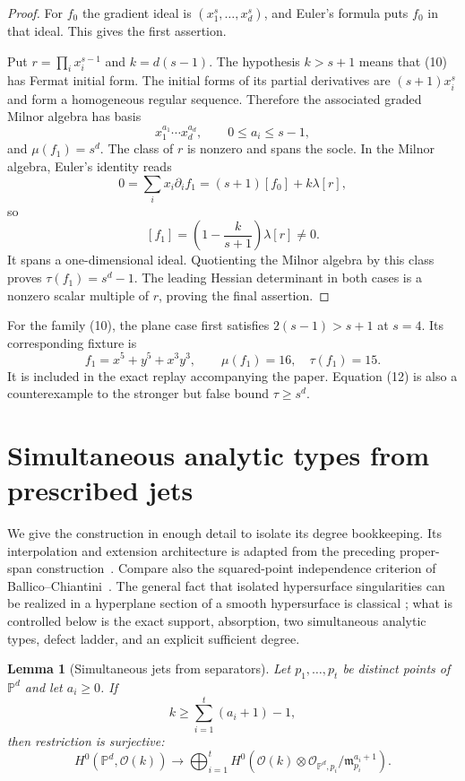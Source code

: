 \documentclass[11pt,a4paper]{article}
\newtheorem{lemma}[theorem]{Lemma}
\theoremstyle{definition}
\newcommand{\PP}{\mathbb P}
\newcommand{\cO}{\mathcal O}
\newcommand{\m}{\mathfrak m}
\begin{document}
\begin{proof}
For $f_0$ the gradient ideal is $(x_1^s,\ldots,x_d^s)$, and Euler's formula
puts $f_0$ in that ideal.  This gives the first assertion.

Put $r=\prod_i x_i^{s-1}$ and $k=d(s-1)$.  The hypothesis $k>s+1$ means
that (10) has Fermat initial form.  The initial forms of its partial
derivatives are $(s+1)x_i^s$ and form a homogeneous regular sequence.
Therefore the associated graded Milnor algebra has basis
\[
 x_1^{a_1}\cdots x_d^{a_d},\qquad 0\le a_i\le s-1,
\]
and $\mu(f_1)=s^d$.  The class of $r$ is nonzero and spans the socle.  In the
Milnor algebra, Euler's identity reads
\[
 0=\sum_i x_i\partial_i f_1=(s+1)[f_0]+k\lambda[r],
\]
so
\[
 [f_1]=\left(1-\frac{k}{s+1}\right)\lambda[r]\ne0.
\]
It spans a one-dimensional ideal.  Quotienting the Milnor algebra by this
class proves $\tau(f_1)=s^d-1$.  The leading Hessian determinant in both
cases is a nonzero scalar multiple of $r$, proving the final assertion.
\end{proof}

For the family (10), the plane case first satisfies
$2(s-1)>s+1$ at $s=4$.  Its corresponding fixture is
\[
 f_1=x^5+y^5+x^3y^3,\qquad \mu(f_1)=16,\quad\tau(f_1)=15. \tag{12}
\]
It is included in the exact replay accompanying the paper.  Equation (12)
is also a counterexample to the stronger but false bound $\tau\ge s^d$.

\section{Simultaneous analytic types from prescribed jets}

We give the construction in enough detail to isolate its degree bookkeeping.
Its interpolation and extension architecture is adapted from the preceding
proper-span construction~\cite{ErikssonOsculating2026}.  Compare also the
squared-point independence criterion of
Ballico--Chiantini~\cite[Theorem~3.5]{BallicoChiantini2021}.  The general
fact that isolated hypersurface singularities can be realized in a
hyperplane section of a smooth hypersurface is classical
\cite[Proposition~11.6]{Dimca1987}; what is controlled below is the exact
support, absorption, two simultaneous analytic types, defect ladder, and an
explicit sufficient degree.

\begin{lemma}[Simultaneous jets from separators]\label{lem:jets}
Let $p_1,\ldots,p_t$ be distinct points of $\PP^d$ and let $a_i\ge0$.  If
\[
 k\ge\sum_{i=1}^t(a_i+1)-1,
\]
then restriction is surjective:
\[
 H^0(\PP^d,\cO(k))\longrightarrow
 \bigoplus_{i=1}^t
 H^0\!\left(\cO(k)\otimes\cO_{\PP^d,p_i}/\m_{p_i}^{a_i+1}\right).
\]
\end{lemma}
\end{document}
